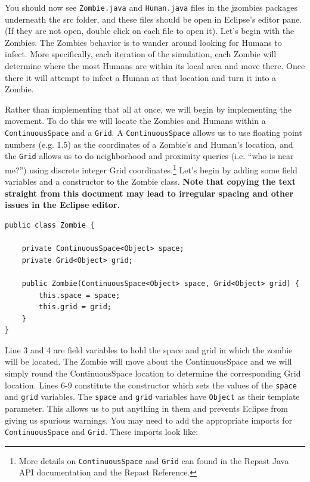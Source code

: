\documentclass[11pt]{amsart}
\begin{document}
You should now see  \texttt{Zombie.java}  and \texttt{Human.java} files in the jzombies packages underneath the src folder, and these files should be open in Eclipse's editor pane. (If they are not open, double click on each file to open it). Let's begin with the Zombies. The Zombies behavior is to wander around looking for Humans to infect. More specifically, each iteration of the simulation, each Zombie will determine where the most Humans are within its local area and move there. Once there it will attempt to infect a Human at that location and turn it into a Zombie. 

Rather than implementing that all at once, we will begin by implementing the movement. To do this we will locate the Zombies and Humans within a \texttt{ContinuousSpace} and a \texttt{Grid}. A \texttt{ContinuousSpace} allows us to use floating point numbers (e.g. 1.5) as the coordinates of a Zombie's and Human's location, and the \texttt{Grid} allows us to do neighborhood and proximity queries (i.e. ``who is near me?'') using discrete integer Grid coordinates.\footnote{More details on \texttt{ContinuousSpace} and \texttt{Grid} can found in the Repast Java API documentation and the Repast Reference.} Let's begin by adding some field variables and a constructor to the Zombie class. \textbf{Note that copying the text straight from this document may lead to irregular spacing and other issues in the Eclipse editor.}

\noindent\begin{minipage}[h]{\textwidth}
\vspace{.2in}
\lstset{language=java,caption=Zombie Constructor and Variables}
\begin{lstlisting}
public class Zombie {

	private ContinuousSpace<Object> space;
	private Grid<Object> grid;
	
	public Zombie(ContinuousSpace<Object> space, Grid<Object> grid) {
		this.space = space;
		this.grid = grid;
	}
}
\end{lstlisting}
\vspace{.2in}
\end{minipage}

Line 3 and 4 are field variables to hold the space and grid in which the zombie will be located. The Zombie will move about the ContinuousSpace and we will simply round the ContinuousSpace location to determine the corresponding Grid location. Lines 6-9 constitute the constructor which sets the values of the \texttt{space} and \texttt{grid} variables. The \texttt{space} and \texttt{grid} variables have \texttt{Object} as their template parameter. This allows us to put anything in them and prevents Eclipse from giving us spurious warnings. You may need to add the appropriate imports for \texttt{ContinuousSpace} and \texttt{Grid}. These imports look like:
\end{document}
